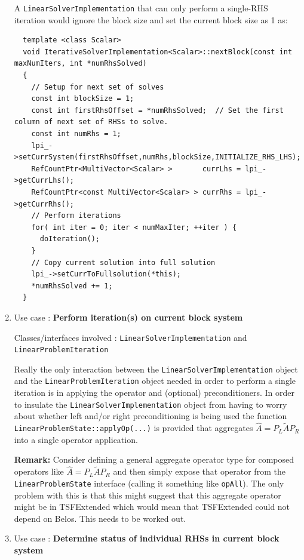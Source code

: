 \documentclass[pdf,ps2pdf,11pt]{SANDreport}
\begin{document}
\begin{enumerate}
A {}\texttt{Linear\-Solver\-Implementation} that can only perform a
single-RHS iteration would ignore the block size and set the current
block size as 1 as:

{\scriptsize\begin{verbatim}
  template <class Scalar>
  void IterativeSolverImplementation<Scalar>::nextBlock(const int maxNumIters, int *numRhsSolved)
  {
    // Setup for next set of solves
    const int blockSize = 1;
    const int firstRhsOffset = *numRhsSolved;  // Set the first column of next set of RHSs to solve.
    const int numRhs = 1;
    lpi_->setCurrSystem(firstRhsOffset,numRhs,blockSize,INITIALIZE_RHS_LHS);
    RefCountPtr<MultiVector<Scalar> >       currLhs = lpi_->getCurrLhs();
    RefCountPtr<const MultiVector<Scalar> > currRhs = lpi_->getCurrRhs();
    // Perform iterations
    for( int iter = 0; iter < numMaxIter; ++iter ) {
      doIteration();
    }
    // Copy current solution into full solution
    lpi_->setCurrToFullsolution(*this);
    *numRhsSolved += 1;
  }
\end{verbatim}}

{}\item Use case : \textbf{Perform iteration(s) on current block
system}

{}\noindent{}Classes/interfaces involved :
{}\texttt{Linear\-Solver\-Implementation} and
{}\texttt{Linear\-Problem\-Iteration}

Really the only interaction between the
{}\texttt{Linear\-Solver\-Implementation} object and the
{}\texttt{Linear\-Problem\-Iteration} object needed in order to
perform a single iteration is in applying the operator and (optional)
preconditioners.  In order to insulate the
{}\texttt{Linear\-Solver\-Implementation} object from having to worry
about whether left and/or right preconditioning is being used the
function {}\texttt{Linear\-Problem\-State::\-apply\-Op(...)} is
provided that aggregates $\hat{A} = P_L \tilde{A} P_R$ into a single
operator application.

{}\noindent{}\textbf{Remark:} Consider defining a general aggregate
operator type for composed operators like $\hat{A} = P_L \tilde{A}
P_R$ and then simply expose that operator from the
{}\texttt{Linear\-Problem\-State} interface (calling it something like
{}\texttt{opAll}).  The only problem with this is that this might
suggest that this aggregate operator might be in TSFExtended which
would mean that TSFExtended could not depend on Belos.  This needs to
be worked out.

{}\item Use case : \textbf{Determine status of individual RHSs in 
current block system}


\end{enumerate}
\end{document}
